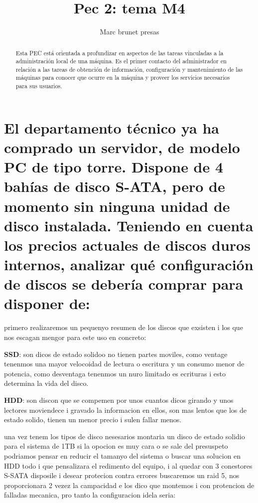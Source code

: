 \documentclass[preprint,11pt]{elsarticle}
\begin{document}
\begin{frontmatter}

    \title{Pec 2: tema M4}
    \author{Marc brunet presas}
    \address{Manresa, Barcelona,}
    \begin{abstract}
    Esta PEC está orientada a profundizar en aspectos de las tareas vinculadas a la administración local de una máquina. Es el primer contacto del administrador en relación a las tareas de obtención de información, configuración y mantenimiento de las máquinas para conocer que ocurre en la máquina y proveer los servicios necesarios para sus usuarios.

    \end{abstract}
\end{frontmatter}

\section{El departamento técnico ya ha comprado un servidor, de modelo PC de tipo torre. Dispone de 4 bahías de disco S-ATA, pero de momento sin ninguna unidad de disco instalada. Teniendo en cuenta los precios actuales de discos duros internos, analizar qué configuración de discos se debería comprar para disponer de:}

primero realizaremos un pequenyo resumen de los discos que exsisten i los que nos escagan mengor para este uso en concreto:\smallskip

\textbf{SSD}: son dicos de estado solidoo no tienen partes moviles, como ventage tenenmos una mayor velocoidad de lectura o escritura y un consumo menor de potencia, como desventaga tenenmos un nuro limitado es ecrituras i esto determina la vida del disco.\smallskip

\textbf{HDD}: son discon que se compemen por unos cuantos dicos girando y unos lectores moviendece i gravado la informacion en ellos, son mas lentos que los de estado solido, tienen un menor precio i sulen fallar menos. \smallskip

una vez tenem los tipos de disco nesesarios montaria un disco de estado solidio para el sistema de 1TB si la opocion es muy cara o se sale del presuspeto podriamos pensar en reducir el tamanyo del sistema o buscar una solucion en HDD todo i que pensalizara el redimento del equipo, i al quedar con 3 conestores S-SATA disposile i desear protecion contra errores buscaremos un raid 5, nos proporcionara 2 vezez la campacidad e los dico que montemos i con protencion de falladas mecanica, pro tanto la configuracion idela seria:\smallskip
\end{document}
